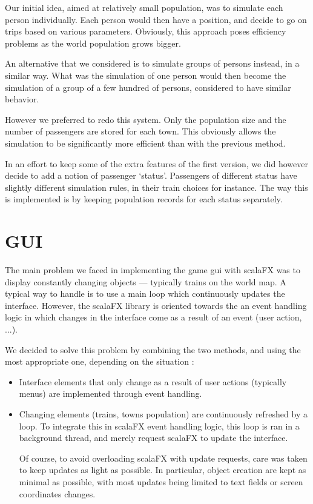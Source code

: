 \documentclass{article}
\begin{document}
Our initial idea, aimed at relatively small population, was to simulate each person individually.
Each person would then have a position, and decide to go on trips based on various parameters.
Obviously, this approach poses efficiency problems as the world population grows bigger.

An alternative that we considered is to simulate groups of persons instead, in a similar way.
What was the simulation of one person would then become the simulation of a group of a few hundred of persons,
considered to have similar behavior.

However we preferred to redo this system. Only the population size and the number of passengers are stored
for each town. This obviously allows the simulation to be significantly more efficient than with the previous method.

In an effort to keep some of the extra features of the first version, we did however decide to add
a notion of passenger `status'. Passengers of different status have slightly different simulation rules,
in their train choices for instance. The way this is implemented is by keeping population records for each 
status separately.

\section{GUI}
The main problem we faced in implementing the game gui with scalaFX was to display constantly changing objects ---
typically trains on the world map. A typical way to handle is to use a main loop which continuously updates the interface.
However, the scalaFX library is oriented towards the an event handling logic
in which changes in the interface come as a result of an event (user action, ...).

We decided to solve this problem by combining the two methods, 
and using the most appropriate one, depending on the situation :
\begin{itemize}
\item Interface elements that only change as a result of user actions (typically menus) 
are implemented through event handling.

\item Changing elements (trains, towns population) are continuously refreshed by a loop.
To integrate this in scalaFX event handling logic, this loop is ran in a background thread,
and merely request scalaFX to update the interface.

Of course, to avoid overloading scalaFX with update requests, care was taken to keep updates as light as possible.
In particular, object creation are kept as minimal as possible, with most updates being limited to text fields
or screen coordinates changes.
\end{itemize}
\end{document}
